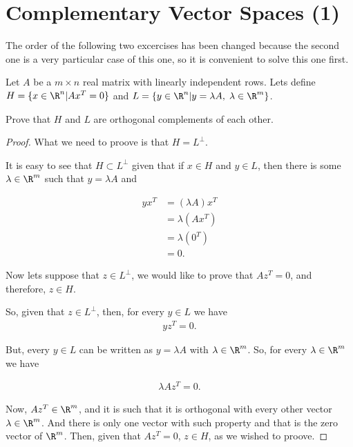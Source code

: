﻿\chapter{Complementary Vector Spaces (1)}
    The order of the following two excercises has been changed because the second one is
    a very particular case of this one, so it is convenient to solve this one first.

    \begin{theorem}
        Let $A$ be a $m \times n$ real matrix with linearly independent rows.
        Lets define $H = \{x \in \R^n | Ax^T = 0 \}$ and 
        $L = \{ y \in \R^n | y = \lambda A, \; \lambda \in \R^m\}$.\pn
        
        Prove that $H$ and $L$ are orthogonal complements of each other.
    \end{theorem}
    
    \begin{proof}
        What we need to proove is that $H = L^\perp$.\pn
        
        It is easy to see that $H \subset L^\perp$ given that if $x \in H$ and $y \in L$, then
        there is some $\lambda \in \R^m$ such that $y = \lambda A$ and
        
        \begin{align}
                yx^T    &=  (\lambda A) x^T \\
                        &=  \lambda (A x^T) \\
                        &=  \lambda (0^T)   \\
                        &=  0.
        \end{align}\pn
        
        Now lets suppose that $z \in L^\perp$, we would like to prove that $A z^T = 0$, and therefore,
        $z \in H$.\pn
        
        So, given that $z \in L^\perp$, then, for every $y \in L$ we have
        \begin{align}
                    yz^T = 0.
        \end{align}\pn
        
        But, every $y \in L$ can be written as $y = \lambda A$ with $\lambda \in \R^m$. So, 
        for every $\lambda \in \R^m$ we have 
        
        \begin{align}
                \lambda A z^T   = 0.
        \end{align}
        
        Now, $A z^T \in \R^m$, and it is such that it is orthogonal with every other vector 
        $\lambda \in \R^m$. And there is only one vector with such property and that is the
        zero vector of $\R^m$. Then, given that $A z^T = 0$, $z \in H$, as we wished to proove.
    \end{proof}